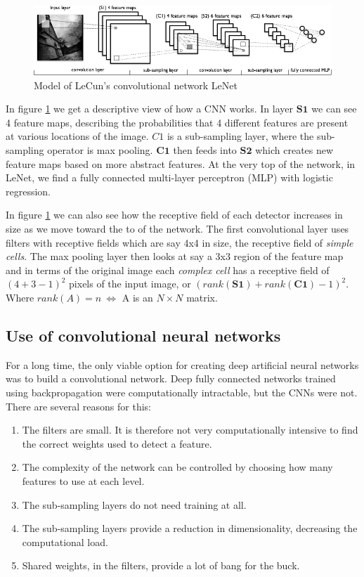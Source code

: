 \documentclass[11pt]{article}
\begin{document}
\begin{figure}[htb]
  \centering
  \includegraphics[width=\textwidth]{mylenet.png}
  \caption{Model of LeCun's convolutional network LeNet}
  \label{fig:mylenet}
\end{figure}

In figure \ref{fig:mylenet} we get a descriptive view of how a CNN works.  In layer $\mathbf{S1}$ we can see 4 feature maps, describing the probabilities that 4 different features are present at various locations of the image.  $C1$ is a sub-sampling layer, where the sub-sampling operator is max pooling.  $\mathbf{C1}$ then feeds into $\mathbf{S2}$ which creates new feature maps based on more abstract features.  At the very top of the network, in LeNet, we find a fully connected multi-layer perceptron (MLP) with logistic regression.

In figure \ref{fig:mylenet} we can also see how the receptive field of each detector increases in size as we move toward the to of the network.  The first convolutional layer uses filters with receptive fields which are say 4x4 in size, the receptive field of \textit{simple cells}.  The max pooling layer then looks at say a 3x3 region of the feature map and in terms of the original image each \textit{complex cell} has a receptive field of $(4 + 3 - 1)^2$ pixels of the input image, or $(rank(\mathbf{S1}) + rank(\mathbf{C1}) - 1)^2$.  Where $rank(A) = n\ \Leftrightarrow$ A is an $N\times N$ matrix.

\subsection{Use of convolutional neural networks}

For a long time, the only viable option for creating deep artificial neural networks was to build a convolutional network.  Deep fully connected networks trained using backpropagation were computationally intractable, but the CNNs were not.  There are several reasons for this:

\begin{enumerate}
\item The filters are small.  It is therefore not very computationally intensive to find the correct weights used to detect a feature.
\item The complexity of the network can be controlled by choosing how many features to use at each level.
\item The sub-sampling layers do not need training at all.
\item The sub-sampling layers provide a reduction in dimensionality, decreasing the computational load.
\item Shared weights, in the filters, provide a lot of bang for the buck.
\end{enumerate}
\end{document}
